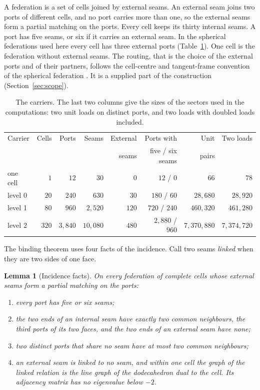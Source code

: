 \documentclass[11pt]{article}
\newtheorem{lemma}[theorem]{Lemma}
\theoremstyle{definition}
\theoremstyle{remark}
\theoremstyle{plain}
\begin{document}
A federation is a set of cells joined by external seams. An external seam
joins two ports of different cells, and no port carries more than one, so
the external seams form a partial matching on the ports. Every cell keeps
its thirty internal seams. A port has five seams, or six if it carries an
external seam. In the spherical federations used here every cell has three
external ports (Table~\ref{tab:carriers}). One cell is the federation
without external seams. The routing, that is the choice of the external
ports and of their partners, follows the cell-centre and tangent-frame
convention of the spherical federation \cite{ophmicro}. It is a supplied
part of the construction (Section~\ref{sec:scope}).

\begin{table}[!htb]
\centering
\caption{The carriers. The last two columns give the sizes of the sectors
used in the computations: two unit loads on distinct ports, and two loads
with doubled loads included.}
\label{tab:carriers}
\begin{tabular}{@{}lrrrrrrr@{}}
\toprule
Carrier & Cells & Ports & Seams & External & Ports with & Unit & Two loads \\
 & & & & seams & five / six seams & pairs & \\
\midrule
one cell & $1$ & $12$ & $30$ & $0$ & $12$ / $0$ & $66$ & $78$ \\
level 0 & $20$ & $240$ & $630$ & $30$ & $180$ / $60$ & $28{,}680$ & $28{,}920$ \\
level 1 & $80$ & $960$ & $2{,}520$ & $120$ & $720$ / $240$ & $460{,}320$ & $461{,}280$ \\
level 2 & $320$ & $3{,}840$ & $10{,}080$ & $480$ & $2{,}880$ / $960$ & $7{,}370{,}880$ & $7{,}374{,}720$ \\
\bottomrule
\end{tabular}
\end{table}

The binding theorem uses four facts of the incidence. Call two seams
\emph{linked} when they are two sides of one face.

\begin{lemma}[Incidence facts]
\label{lem:incidence}
On every federation of complete cells whose external seams form a partial
matching on the ports:
\begin{enumerate}[label=\textup{(\roman*)},leftmargin=2.2em,itemsep=1pt]
\item every port has five or six seams;
\item the two ends of an internal seam have exactly two common neighbours,
the third ports of its two faces, and the two ends of an external seam have
none;
\item two distinct ports that share no seam have at most two common
neighbours;
\item an external seam is linked to no seam, and within one cell the graph
of the linked relation is the line graph of the dodecahedron dual to the
cell. Its adjacency matrix has no eigenvalue below $-2$.
\end{enumerate}
\end{lemma}
\end{document}
